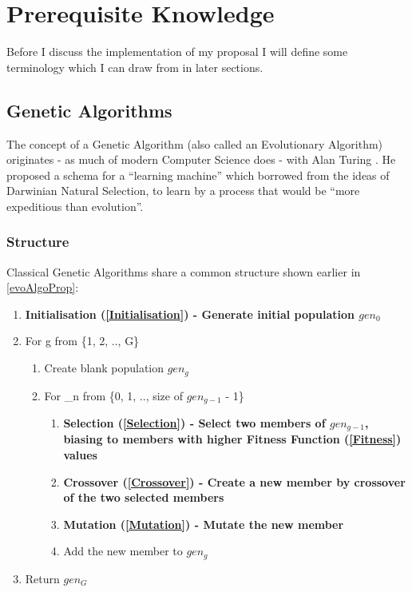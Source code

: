 \section{Prerequisite Knowledge}
Before I discuss the implementation of my proposal I will define some terminology which I can draw from in later sections.
\subsection{Genetic Algorithms}
The concept of a Genetic Algorithm (also called an Evolutionary Algorithm) originates - as much of modern Computer Science does - with Alan Turing \cite{turingImitation}. He proposed a schema for a ``learning machine'' which borrowed from the ideas of Darwinian Natural Selection, to learn by a process that would be ``more expeditious than evolution''.

\subsubsection{Structure} \label{Structure}
Classical Genetic Algorithms share a common structure shown earlier in \ref{evoAlgoProp}:
\begin{enumerate}
    \item \bf Initialisation (\ref{Initialisation}) \rm - Generate initial population $gen_{0}$
    \item For g from \{1, 2, .., G\}
    \begin{enumerate}
        \item Create blank population $gen_{g}$
        \item For \_n from \{0, 1, .., size of $gen_{g-1}$ - 1\}
        \begin{enumerate}
            \item \bf Selection (\ref{Selection}) \rm - Select two members of $gen_{g-1}$, biasing to members with higher \bf Fitness Function (\ref{Fitness}) \rm values
            \item \bf Crossover (\ref{Crossover}) \rm - Create a new member by crossover of the two selected members
            \item \bf Mutation (\ref{Mutation}) \rm - Mutate the new member
            \item Add the new member to $gen_{g}$
        \end{enumerate}
    \end{enumerate}
    \item Return $gen_{G}$
\end{enumerate}

